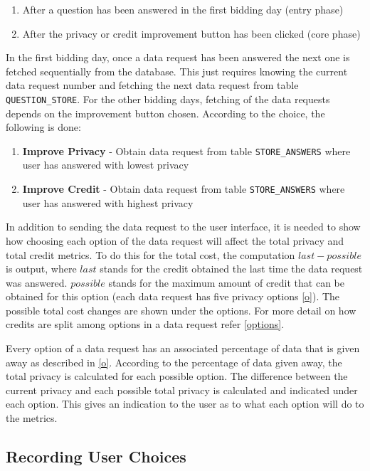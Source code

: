 \begin{enumerate}
	\item After a question has been answered in the first bidding day (entry phase)
	\item After the privacy or credit improvement button has been clicked (core phase)
\end{enumerate}

In the first bidding day, once a data request has been answered the next one is fetched sequentially from the database. This just requires knowing the current data request number and fetching the next data request from table \texttt{QUESTION\_STORE}. For the other bidding days, fetching of the data requests depends on the improvement button chosen. According to the choice, the following is done:

\begin{enumerate}
	\item \textbf{Improve Privacy} - Obtain data request from table \texttt{STORE\_ANSWERS} where user has answered with lowest privacy
	\item \textbf{Improve Credit} - Obtain data request from table \texttt{STORE\_ANSWERS} where user has answered with highest privacy
\end{enumerate}

In addition to sending the data request to the user interface, it is needed to show how choosing each option of the data request will affect the total privacy and total credit metrics. To do this for the total cost, the computation $last-possible$ is output, where $last$ stands for the credit obtained the last time the data request was answered. $possible$ stands for the maximum amount of credit that can be obtained for this option (each data request has five privacy options \ref{o}). The possible total cost changes are shown under the options. For more detail on how credits are split among options in a data request refer \ref{options}.

Every option of a data request has an associated percentage of data that is given away as described in \ref{o}. According to the percentage of data given away, the total privacy is calculated for each possible option. The difference between the current privacy and each possible total privacy is calculated and indicated under each option. This gives an indication to the user as to what each option will do to the metrics.

\subsection{Recording User Choices}


